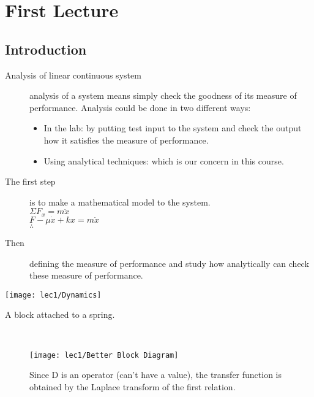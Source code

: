 \setchapterpreamble[u]{\margintoc}
\chapter{First Lecture}


\section{Introduction}

\begin{description}
	\item[Analysis of linear continuous system] analysis of a system means simply check the goodness of its measure of performance.
Analysis could be done in two different ways:
\begin{itemize}
	\item In the lab: by putting test input to the system and check the output how it satisfies the measure of performance.
	\item Using analytical techniques: which is our concern in this course.
\end{itemize}
	\item[The first step] is to make a mathematical model to the system. \\[+1mm]
	$\Sigma F_x = m\ddot{x}$\\
	$F - \mu\dot{x} + kx = m\ddot{x}$\\
	$\therefore$
	\\[-2mm]
	\item[Then] defining the measure of performance and study how analytically can check these measure of performance.
\end{description}

\begin{marginfigure}[-3cm]
		\texttt{[image: lec1/Dynamics]}
		\caption[Spring problem: figure]{A block attached to a spring.}
\end{marginfigure}

 \leavevmode\\[-1.55cm]
 \begin{figure}[hb]
		\raggedleft
		\texttt{[image: lec1/Better Block Diagram]}
		\caption[Spring problem: block diagram]{Since D is an operator (can't have a value),  the transfer function is obtained by the Laplace transform of the first relation.}
\end{figure}
 \leavevmode\\[-1.3cm]

